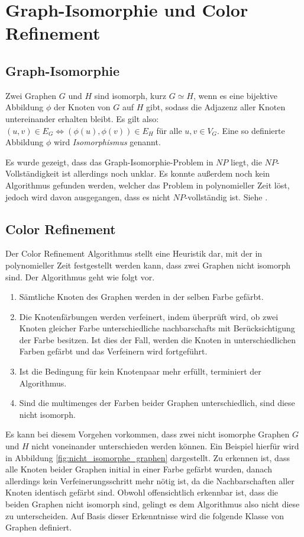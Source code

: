 \section{Graph-Isomorphie und Color Refinement}
\label{sec/gi_cr}

\subsection{Graph-Isomorphie}
Zwei Graphen $G$ und $H$ sind isomorph, kurz $G\simeq H$, wenn es eine bijektive Abbildung $\phi$ der Knoten von $G$ auf $H$ gibt, sodass die Adjazenz aller Knoten untereinander erhalten bleibt.
Es gilt also: $(u,v)\in E_G\Leftrightarrow (\phi (u),\phi (v))\in E_H$ für alle $u,v\in V_G$.
Eine so definierte Abbildung $\phi$ wird \emph{Isomorphismus} genannt.

Es wurde gezeigt, dass das Graph-Isomorphie-Problem in $NP$ liegt, die $NP$-Vollständigkeit ist allerdings noch unklar.
Es konnte außerdem noch kein Algorithmus gefunden werden, welcher das Problem in polynomieller Zeit löst, jedoch wird davon ausgegangen, dass es nicht $NP$-vollständig ist.
Siehe \cite{Goldreich1991}.

\subsection{Color Refinement}
\label{sec/cr}
Der Color Refinement Algorithmus stellt eine Heuristik dar, mit der in polynomieller Zeit festgestellt werden kann, dass zwei Graphen nicht isomorph sind.
Der Algorithmus geht wie folgt vor.
\begin{enumerate}
	\item Sämtliche Knoten des Graphen werden in der selben Farbe gefärbt.
	\item Die Knotenfärbungen werden verfeinert, indem überprüft wird, ob zwei Knoten gleicher Farbe unterschiedliche \glspl{nachbarschaft} mit Berücksichtigung der Farbe besitzen.
	Ist dies der Fall, werden die Knoten in unterschiedlichen Farben gefärbt und das Verfeinern wird fortgeführt.
	\item Ist die Bedingung für kein Knotenpaar mehr erfüllt, terminiert der Algorithmus.
	\item Sind die \glspl{multimenge} der Farben beider Graphen unterschiedlich, sind diese nicht isomorph.
\end{enumerate}

Es kann bei diesem Vorgehen vorkommen, dass zwei nicht isomorphe Graphen $G$ und $H$ nicht voneinander unterschieden werden können.
Ein Beispiel hierfür wird in Abbildung \ref{fig:nicht_isomorphe_graphen} dargestellt.
Zu erkennen ist, dass alle Knoten beider Graphen initial in einer Farbe gefärbt wurden, danach allerdings kein Verfeinerungsschritt mehr nötig ist, da die Nachbarschaften aller Knoten identisch gefärbt sind.
Obwohl offensichtlich erkennbar ist, dass die beiden Graphen nicht isomorph sind, gelingt es dem Algorithmus also nicht diese zu unterscheiden.
Auf Basis dieser Erkenntnisse wird die folgende Klasse von Graphen definiert.

